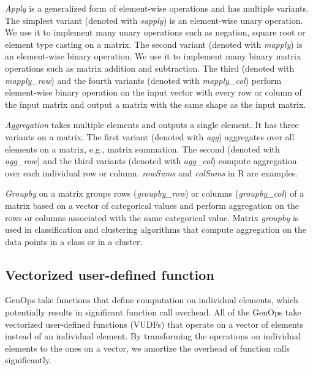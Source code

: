 \textit{Apply} is a generalized form of element-wise operations and has
multiple variants. The simplest variant (denoted with \textit{sapply}) is
an element-wise unary operation. We use it to implement many unary
operations such as negation, square root or element type casting
on a matrix. The second variant (denoted with \textit{mapply}) is an
element-wise binary operation. We use it to implement many binary
matrix operations such as matrix addition and subtraction. The third
(denoted with \textit{mapply\_row}) and the fourth variants (denoted with
\textit{mapply\_col}) perform element-wise
binary operation on the input vector with every row or column of the input
matrix and output a matrix with the same shape as the input matrix.

\textit{Aggregation} takes multiple elements and outputs a single element.
It has three variants on a matrix. The first variant (denoted with \textit{agg})
aggregates over all elements on a matrix, e.g., matrix summation. The second
(denoted with
\textit{agg\_row}) and the third variants (denoted with \textit{agg\_col})
compute aggregation over each individual row or column. \textit{rowSums}
and \textit{colSums} in R are examples.

\textit{Groupby} on a matrix groups rows (\textit{groupby\_row}) or columns
(\textit{groupby\_col}) of a matrix based on a vector of categorical values
and perform aggregation on the rows or
columns associated with the same categorical value. Matrix \textit{groupby}
is used in classification and clustering algorithms that compute
aggregation on the data points in a class or in a cluster.

\subsection{Vectorized user-defined function} \label{sec:vudf}
GenOps take functions that define computation on individual elements,
which potentially results in significant function call overhead. All of
the GenOps take vectorized user-defined functions (VUDFs) that operate on
a vector of elements instead of an individual element. By transforming
the operations on individual elements to the ones on a vector, we amortize
the overhead of function calls significantly.


